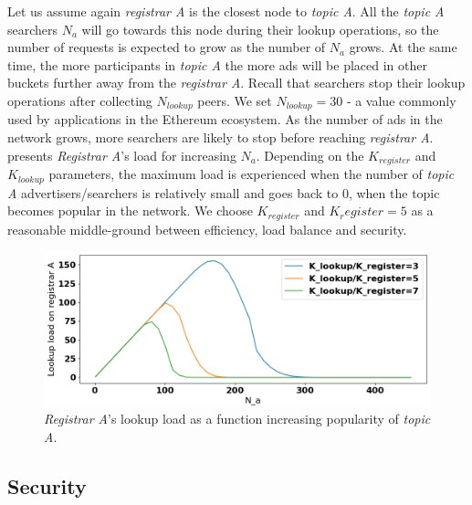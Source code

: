 Let us assume again \emph{registrar A} is the closest node to \emph{topic A}. All the \emph{topic A} searchers $N_a$ will go towards this node during their lookup operations, so the number of requests is expected to grow as the number of $N_a$ grows. At the same time, the more participants in \emph{topic A} the more ads will be placed in other buckets further away from the \emph{registrar A}. Recall that searchers stop their lookup operations after collecting $N_{lookup}$ peers. We set $N_{lookup} = 30$ - a value commonly used by applications in the Ethereum ecosystem. As the number of ads in the network grows, more searchers are likely to stop before reaching \emph{registrar A}.  presents \emph{Registrar A}'s load for increasing $N_a$. Depending on the $K_{register}$ and $K_{lookup}$ parameters, the maximum load is experienced when the number of \emph{topic A} advertisers/searchers is relatively small and goes back to $0$, when the topic becomes popular in the network. We choose $K_{register}$ and $K_register =5$ as a reasonable middle-ground between efficiency, load balance and security.

\begin{figure}[t]
    \includegraphics[width=1\linewidth]{img/fairness_lookup}
    \caption{\emph{Registrar A}'s lookup load as a function increasing popularity of \emph{topic A}.
    }
    \label{fig:fairness_lookup}
\end{figure}

\subsection{Security}

